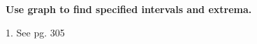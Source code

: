 \documentclass{article}
\begin{document}
\begin{description} %
  \setlength\itemsep{5em}

  \item\textbf{Use graph to find specified intervals and extrema.}

        \begin{description} %
          \setlength\itemsep{3em}

          \item 1. See pg. 305


        \end{description}

\end{description}
\end{document}
